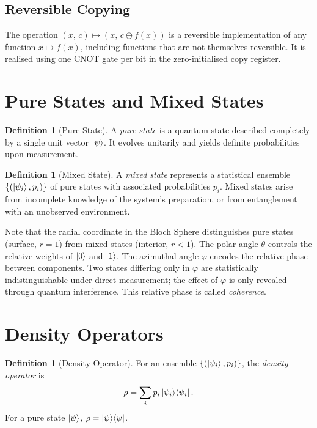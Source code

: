 \documentclass[12pt, a4paper, oneside]{report}
\theoremstyle{plain}
\theoremstyle{definition}
\newtheorem{definition}[theorem]{Definition}
\theoremstyle{remark}
\newcommand{\oket}[2]{\ket{#1}\!\bra{#2}}
\begin{document}
\subsection{Reversible Copying}

The operation $(x,\, c) \mapsto (x,\, c \oplus f(x))$ is a reversible implementation of any
function $x \mapsto f(x)$, including functions that are not themselves reversible. It is
realised using one CNOT gate per bit in the zero-initialised copy register.



\section{Pure States and Mixed States}

\begin{definition}[Pure State]
	A \emph{pure state} is a quantum state described completely by a single unit vector
	$\ket{\psi}$. It evolves unitarily and yields definite probabilities upon measurement.
\end{definition}

\begin{definition}[Mixed State]
	A \emph{mixed state} represents a statistical ensemble $\{(\ket{\psi_i}, p_i)\}$ of pure
	states with associated probabilities $p_i$. Mixed states arise from incomplete knowledge of
	the system's preparation, or from entanglement with an unobserved environment.
\end{definition}

Note that the radial coordinate in the Bloch Sphere distinguishes pure states (surface, $r=1$) from mixed states (interior,
$r < 1$). The polar angle $\theta$ controls the relative weights of $\ket{0}$ and $\ket{1}$.
The azimuthal angle $\varphi$ encodes the relative phase between components. Two states
differing only in $\varphi$ are statistically indistinguishable under direct measurement;
the effect of $\varphi$ is only revealed through quantum interference. This relative phase is
called \emph{coherence}.

\section{Density Operators}

\begin{definition}[Density Operator]
	For an ensemble $\{(\ket{\psi_i}, p_i)\}$, the \emph{density operator} is
	\[
		\rho = \sum_i p_i \oket{\psi_i}{\psi_i}.
	\]
	For a pure state $\ket{\psi}$, $\rho = \oket{\psi}{\psi}$.
\end{definition}
\end{document}
